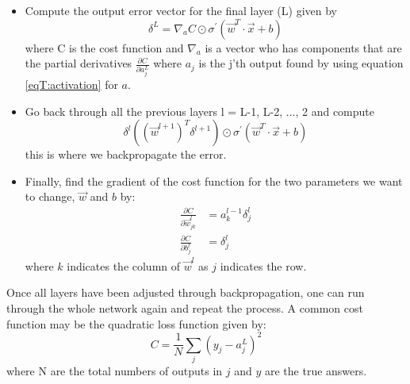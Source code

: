 \begin{itemize}
\item Compute the output error vector for the final layer (L) given by
\begin{equation*}
\delta^L = \nabla_a C \odot \sigma^{'}(\vec{w}^T \cdot \vec{x} + b)
\end{equation*}
where C is the cost function and $\nabla_a$ is a vector who has components that are the partial derivatives $\frac{\partial C}{\partial a_j^L}$ where $a_j$ is the j'th output found by using equation \eqref{eqT:activation} for $a$.
\item Go back through all the previous layers l = L-1, L-2, ..., 2 and compute
\begin{equation*}
\delta^l ((\vec{w}^{l + 1})^T \delta^{l + 1}) \odot \sigma^{'}(\vec{w}^T \cdot \vec{x} + b)
\end{equation*}
this is where we backpropagate the error.
\item Finally, find the gradient of the cost function for the two parameters we want to change, $\vec{w}$ and $b$ by:
\begin{align*}
\frac{\partial C}{\partial \vec{w}_{jk}^l} &= a_k^{l-1}\delta_{j}^{l} \\
\frac{\partial C}{\partial b_{j}^l} &= \delta_{j}^{l}
\end{align*}
where $k$ indicates the column of $\vec{w}^l$ as $j$ indicates the row.
\end{itemize}
Once all layers have been adjusted through backpropagation, one can run through the whole network again and repeat the process. A common cost function may be the quadratic loss function given by:
\begin{equation}
C = \frac{1}{N} \sum\limits_{j} (y_j - a_j^L)^2
\end{equation}
where N are the total numbers of outputs in $j$ and $y$ are the true answers.
%